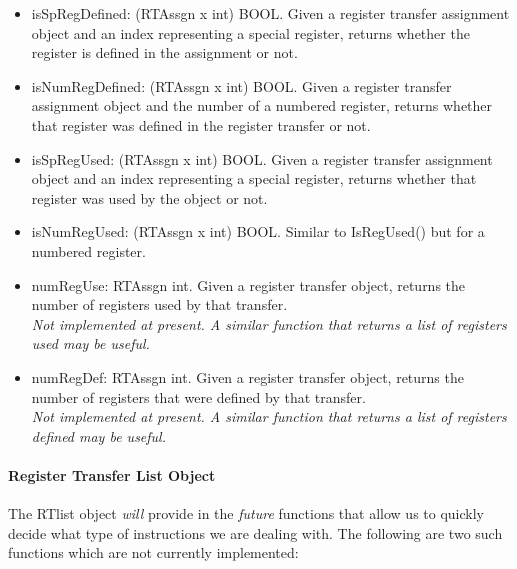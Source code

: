 \begin{itemize}
\item  isSpRegDefined: (RTAssgn x int) \ra BOOL.
    Given a register transfer assignment object and an index representing
    a special register, returns 
    whether the register is defined in the assignment or not.

\item  isNumRegDefined: (RTAssgn x int) \ra BOOL.
    Given a register transfer assignment object and the number of a
    numbered register, returns whether that register was defined
    in the register transfer or not.

\item  isSpRegUsed: (RTAssgn x int) \ra BOOL.
    Given a register transfer assignment object and an index representing
    a special register, returns whether
    that register was used by the object or not.

\item  isNumRegUsed: (RTAssgn x int) \ra BOOL.
    Similar to IsRegUsed() but for a numbered register.

\item  numRegUse: RTAssgn \ra int.
    Given a register transfer object, returns the number of registers
    used by that transfer. \\
    {\it Not implemented at present. A similar function that returns a list of registers used may
    be useful. }

\item  numRegDef: RTAssgn \ra int.
    Given a register transfer object, returns the number of registers
    that were defined by that transfer. \\
    {\it Not implemented at present. A similar function that returns a list of registers defined may
    be useful. }
\end{itemize}


\paragraph{Register Transfer List Object} 
The RTlist object \emph{will} provide in the \emph{future} 
functions that allow us to quickly decide what type of 
instructions we are dealing with.  The following are two
such functions which are not currently implemented:

